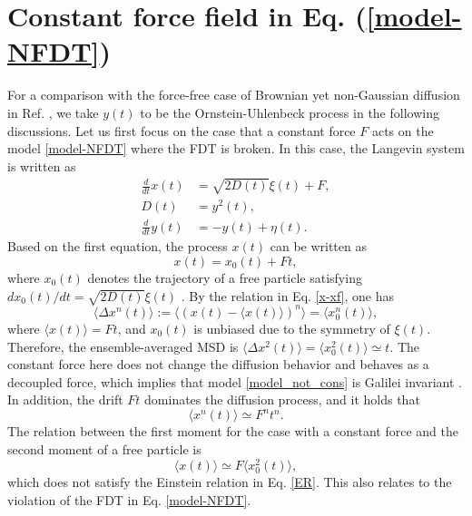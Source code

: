 \documentclass[aps,pre,twocolumn,groupedaddress,longbibliography]{revtex4-2}
\begin{document}
\section{Constant force field in Eq. (\ref{model-NFDT})}\label{Sec4}
For a comparison with the force-free case of Brownian yet non-Gaussian diffusion in Ref. \cite{ChechkinSenoMetzlerSokolov:2017}, we take $y(t)$ to be the Ornstein-Uhlenbeck process in the following discussions.
Let us first focus on the case that a constant force $F$ acts on the model \eqref{model-NFDT} where the FDT is broken. In this case, the Langevin system is written as
\begin{equation}\label{model_not_cons}
\begin{split}
\frac{d}{d t}x(t)&=\sqrt{2D(t)}\xi(t)+F,\\
D(t)&=y^2(t),\\
\frac{d}{d t}y(t)&=-y(t)+\eta(t).
\end{split}
\end{equation}
Based on the first equation, the process $x(t)$ can be written as
\begin{equation}\label{x-xf}
  x(t)=x_0(t)+Ft,
\end{equation}
where $x_0(t)$ denotes the trajectory of a free particle satisfying $dx_0(t)/dt=\sqrt{2D(t)}\xi(t)$ \cite{ChechkinSenoMetzlerSokolov:2017}. By the relation in Eq. \eqref{x-xf}, one has
\begin{equation}\label{relation}
\langle\Delta x^n(t)\rangle:=\langle (x(t)-\langle x(t)\rangle)^n\rangle=\langle x^n_0(t)\rangle,
\end{equation}
where $\langle x(t)\rangle=Ft$, and $x_0(t)$ is unbiased due to the symmetry of $\xi(t)$. Therefore, the ensemble-averaged MSD is $\langle \Delta x^2(t)\rangle=\langle x^2_0(t)\rangle\simeq t$.
The constant force here does not change the diffusion behavior and behaves as a decoupled force, which implies that model \eqref{model_not_cons} is Galilei invariant \cite{MetzlerKlafter:2000,CairoliKlagesBaule:2018,ChenWangDeng:2019-2}.
In addition, the drift $Ft$ dominates the diffusion process, and it holds that
\begin{equation}\label{moments1}
\langle x^n(t)\rangle\simeq F^nt^n.
\end{equation}
The relation between the first moment for the case with a constant force and the second moment of a free particle is
\begin{equation}
  \langle x(t)\rangle \simeq F\langle x^2_0(t)\rangle,
\end{equation}
which does not satisfy the Einstein relation in Eq. \eqref{ER}. This also relates to the violation of the FDT in Eq. \eqref{model-NFDT}.
\end{document}
